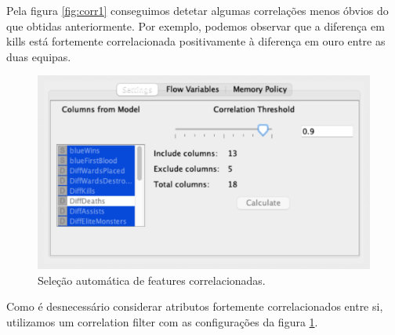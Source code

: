 Pela figura \ref{fig:corr1} conseguimos detetar algumas correlações menos óbvios do que obtidas anteriormente. Por exemplo, podemos observar que a diferença em kills está fortemente correlacionada positivamente à diferença em ouro entre as duas equipas.

\begin{figure}[H]
    \centering
    \includegraphics[width=0.5\linewidth]{Figures/Screenshot_2020-11-25_at_22.10.32.png}
    \caption{Seleção automática de features correlacionadas.}
    \label{fig:corr2}
\end{figure}


Como é desnecessário considerar atributos fortemente correlacionados entre si, utilizamos um correlation filter com as configurações da figura \ref{fig:corr2}.